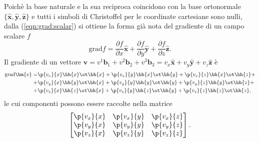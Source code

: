 \begin{example}
 Poichè la base naturale e la sua reciproca coincidono con la base ortonormale $\{\bm{\hat{x}}, \bm{\hat{y}}, \bm{\hat{z}}\}$ e tutti i simboli di Christoffel per le coordinate cartesiane sono nulli, dalla (\ref{eqn:grad:scalar}) si ottiene la forma già nota del gradiente di un campo scalare $f$
\begin{equation}
 \text{grad} f = \dfrac{\partial f}{\partial x} \bm{\hat{x}} +
                 \dfrac{\partial f}{\partial y} \bm{\hat{y}} +
                 \dfrac{\partial f}{\partial z} \bm{\hat{z}} .
\end{equation}
Il gradiente di un vettore $\bm{v} = v^1 \bm{b}_1 +v^2 \bm{b}_2 + v^3 \bm{b}_3  = v_x \bm{\hat{x}} + v_y \bm{\hat{y}} + v_z \bm{\hat{z}}$ è
\begin{equation}
 \begin{aligned}
  \text{grad} \bm{v} = & \p{v_x}{x} \bh{x}\ot\bh{x} + 
                         \p{v_x}{y} \bh{x}\ot\bh{y} +
                         \p{v_x}{z} \bh{x}\ot\bh{z} + \\ 
                     + & \p{v_y}{x} \bh{y}\ot\bh{x} + 
                         \p{v_y}{y} \bh{y}\ot\bh{y} +
                         \p{v_y}{z} \bh{y}\ot\bh{z} + \\ 
                     + & \p{v_z}{x} \bh{z}\ot\bh{x} + 
                         \p{v_z}{y} \bh{z}\ot\bh{y} +
                         \p{v_z}{z} \bh{z}\ot\bh{z} , \\ 
 \end{aligned}
\end{equation}
 le cui componenti possono essere raccolte nella matrice
\begin{equation}
 \begin{bmatrix}
  \p{v_x}{x}  & 
  \p{v_x}{y}  &
  \p{v_x}{z}   \\ 
  \p{v_y}{x}  & 
  \p{v_y}{y}  &
  \p{v_y}{z}   \\ 
  \p{v_z}{x}  & 
  \p{v_z}{y}  &
  \p{v_z}{z}   \\ 
 \end{bmatrix} .
\end{equation}
\end{example} 
%

